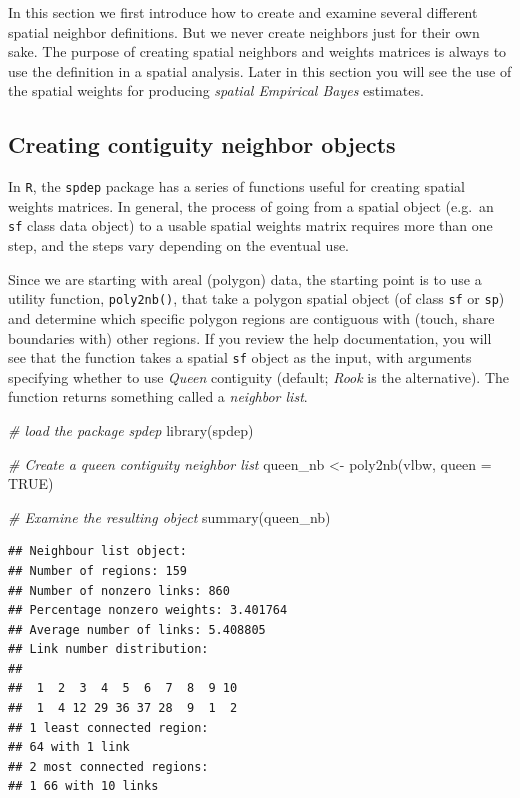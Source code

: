 \documentclass[
]{book}
\newenvironment{Shaded}{\begin{snugshade}}{\end{snugshade}}
\newcommand{\AttributeTok}[1]{\textcolor[rgb]{0.77,0.63,0.00}{#1}}
\newcommand{\CommentTok}[1]{\textcolor[rgb]{0.56,0.35,0.01}{\textit{#1}}}
\newcommand{\ConstantTok}[1]{\textcolor[rgb]{0.00,0.00,0.00}{#1}}
\newcommand{\FunctionTok}[1]{\textcolor[rgb]{0.00,0.00,0.00}{#1}}
\newcommand{\NormalTok}[1]{#1}
\newcommand{\OtherTok}[1]{\textcolor[rgb]{0.56,0.35,0.01}{#1}}
\begin{document}
In this section we first introduce how to create and examine several different spatial neighbor definitions. But we never create neighbors just for their own sake. The purpose of creating spatial neighbors and weights matrices is always to use the definition in a spatial analysis. Later in this section you will see the use of the spatial weights for producing \emph{spatial Empirical Bayes} estimates.

\hypertarget{creating-contiguity-neighbor-objects}{%
\subsection{Creating contiguity neighbor objects}\label{creating-contiguity-neighbor-objects}}

In \texttt{R}, the \texttt{spdep} package has a series of functions useful for creating spatial weights matrices. In general, the process of going from a spatial object (e.g.~an \texttt{sf} class data object) to a usable spatial weights matrix requires more than one step, and the steps vary depending on the eventual use.

Since we are starting with areal (polygon) data, the starting point is to use a utility function, \texttt{poly2nb()}, that take a polygon spatial object (of class \texttt{sf} or \texttt{sp}) and determine which specific polygon regions are contiguous with (touch, share boundaries with) other regions. If you review the help documentation, you will see that the function takes a spatial \texttt{sf} object as the input, with arguments specifying whether to use \emph{Queen} contiguity (default; \emph{Rook} is the alternative). The function returns something called a \emph{neighbor list}.

\begin{Shaded}
\begin{Highlighting}[]
\CommentTok{\# load the package spdep}
\FunctionTok{library}\NormalTok{(spdep)}

\CommentTok{\# Create a queen contiguity neighbor list}
\NormalTok{queen\_nb }\OtherTok{\textless{}{-}} \FunctionTok{poly2nb}\NormalTok{(vlbw, }\AttributeTok{queen =} \ConstantTok{TRUE}\NormalTok{)}

\CommentTok{\# Examine the resulting object}
\FunctionTok{summary}\NormalTok{(queen\_nb)}
\end{Highlighting}
\end{Shaded}

\begin{verbatim}
## Neighbour list object:
## Number of regions: 159 
## Number of nonzero links: 860 
## Percentage nonzero weights: 3.401764 
## Average number of links: 5.408805 
## Link number distribution:
## 
##  1  2  3  4  5  6  7  8  9 10 
##  1  4 12 29 36 37 28  9  1  2 
## 1 least connected region:
## 64 with 1 link
## 2 most connected regions:
## 1 66 with 10 links
\end{verbatim}
\end{document}
